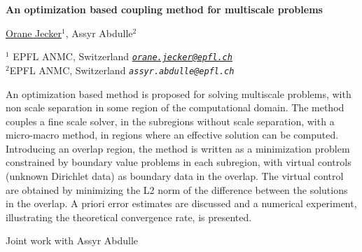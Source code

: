 \documentclass[a4paper, 12pt]{article}
\newcommand{\speaker}[1]{\underline{#1}}
\newcommand{\email}[1]{\hspace*{\stretch{1}}\emph{\texttt{#1}}}
\newenvironment{Title}%
{\begin{framed}\begin{center}\begin{Large}\bfseries}%
			{\end{Large}\end{center}\end{framed}}
\newenvironment{Authors}%
{\begin{center}\begin{bfseries}}%
		{\end{bfseries}\end{center}}
\newenvironment{Addresses}%
{\begin{flushleft}\begin{itshape}}%
		{\end{itshape}\end{flushleft}}
\begin{document}
	\begin{Title}
		An optimization based coupling method for multiscale problems
	\end{Title}
\begin{Authors}
	\speaker{Orane Jecker}$^{1}$, {Assyr Abdulle}$^{2}$
\end{Authors}

\begin{Addresses}
	$^1$  EPFL ANMC, Switzerland
	\email{\speaker{orane.jecker@epfl.ch}} \\ %
	$^{2}$EPFL ANMC,  Switzerland
	\email{assyr.abdulle@epfl.ch} \\
\end{Addresses}

\noindent
An optimization based method is proposed for solving multiscale problems, with non scale separation in some region of the computational domain. The method couples a fine scale solver, in the subregions without scale separation, with a micro-macro method, in regions where an effective solution can be computed. Introducing an overlap region,  the method is written as a minimization problem constrained by boundary value problems in each subregion, with virtual controls (unknown Dirichlet data) as boundary data in the overlap. The virtual control are obtained by minimizing the L2 norm of the difference between the solutions in the overlap. A priori error estimates are discussed and a numerical experiment, illustrating the theoretical convergence rate, is presented.

\vspace{0.1in}
\noindent Joint work with Assyr Abdulle 




\nocite{AbJ15}
\end{document}
